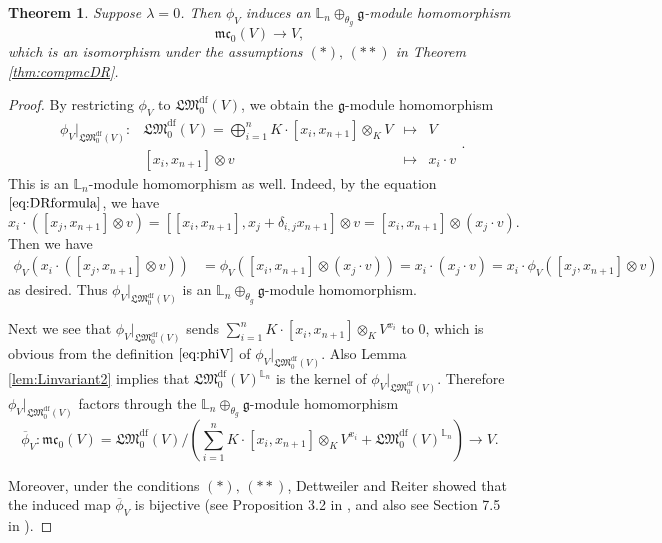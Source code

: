 \documentclass[a4paper,12pt]{article}
\newtheorem{thm}{Theorem}[section]
\theoremstyle{definition}
\theoremstyle{remark}
\begin{document}
\begin{thm}\label{thm:mc0}
	Suppose $\lambda=0$.
	Then $\phi_{V}$ induces an $\mathbb{L}_{n}\oplus_{\theta_{g}}\mathfrak{g}$-module homomorphism
	\[
		\mathfrak{mc}_{0}(V)\to V,
	\]
	which is an isomorphism 
	under the assumptions $(*),\, (**)$ in Theorem \ref{thm:compmcDR}.
\end{thm}
\begin{proof}
By restricting $\phi_{V}$ to $\mathfrak{LM}_{0}^{\mathrm{df}}(V)$, we obtain the $\mathfrak{g}$-module homomorphism
\begin{equation}\label{eq:phiV}
	\begin{array}{cccc}	
\phi_{V}|_{\mathfrak{LM}_{0}^{\mathrm{df}}(V)}\colon &\mathfrak{LM}_{0}^{\mathrm{df}}(V)=\bigoplus_{i=1}^{n} K\cdot [x_{i},x_{n+1}]\otimes_{K} V&\longmapsto &V\\
&[x_{i},x_{n+1}]\otimes v&\longmapsto &x_{i}\cdot v
	\end{array}.
\end{equation}
This is an $\mathbb{L}_{n}$-module homomorphism as well. Indeed, by the equation $\eqref{eq:DRformula}$, we have
\[
	x_{i}\cdot ([x_{j},x_{n+1}]\otimes v)=[[x_{i},x_{n+1}],x_{j}+\delta_{i,j}x_{n+1}]\otimes v=[x_{i},x_{n+1}]\otimes (x_{j}\cdot v).
\]
Then we have 
\begin{align*}
	\phi_{V}(x_{i}\cdot ([x_{j},x_{n+1}]\otimes v))&=\phi_{V}([x_{i},x_{n+1}]\otimes (x_{j}\cdot v))=x_{i}\cdot (x_{j}\cdot v)=x_{i}\cdot \phi_{V}([x_{j},x_{n+1}]\otimes v)
\end{align*}
as desired. 
Thus $\phi_{V}|_{\mathfrak{LM}_{0}^{\mathrm{df}}(V)}$ is an $\mathbb{L}_{n}\oplus_{\theta_{g}}\mathfrak{g}$-module homomorphism.

Next we see that 
$\phi_{V}|_{\mathfrak{LM}_{0}^{\mathrm{df}}(V)}$
sends $\sum_{i=1}^{n} K\cdot [x_{i},x_{n+1}]\otimes_{K} V^{x_{i}}$ to $0$,
which is obvious from the definition $\eqref{eq:phiV}$ of $\phi_{V}|_{\mathfrak{LM}_{0}^{\mathrm{df}}(V)}$.
Also Lemma \ref{lem:Linvariant2} implies that $\mathfrak{LM}_{0}^{\mathrm{df}}(V)^{\mathbb{L}_{n}}$ 
is the kernel of $\phi_{V}|_{\mathfrak{LM}_{0}^{\mathrm{df}}(V)}$.
Therefore $\phi_{V}|_{\mathfrak{LM}_{0}^{\mathrm{df}}(V)}$ factors through the $\mathbb{L}_{n}\oplus_{\theta_{g}}\mathfrak{g}$-module homomorphism
\[
	\overline{\phi}_{V}\colon \mathfrak{mc}_{0}(V)
	=\mathfrak{LM}_{0}^{\mathrm{df}}(V)/\left(\sum_{i=1}^{n} K\cdot [x_{i},x_{n+1}]\otimes_{K} V^{x_{i}}
	+\mathfrak{LM}_{0}^{\mathrm{df}}(V)^{\mathbb{L}_{n}}\right)
	\longrightarrow V.
\]

Moreover, under the conditions $(*),\,(**)$, Dettweiler and Reiter \cite{DR00} showed that 
the induced map $\overline{\phi}_{V}$ is
bijective (see Proposition 3.2 in \cite{DR00}, and also see Section 7.5 in \cite{Harbook}).
\end{proof}
\end{document}
